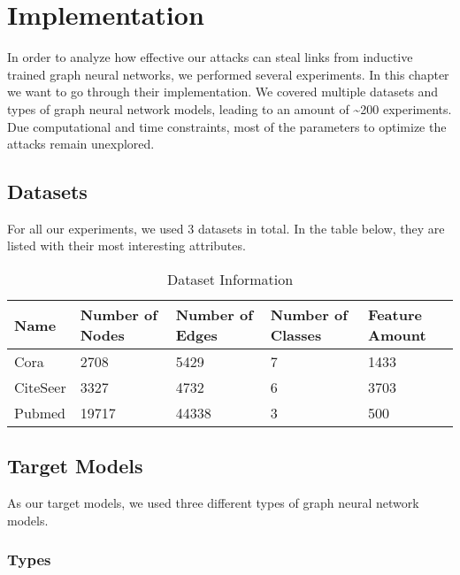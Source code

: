 \chapter{Implementation}

  In order to analyze how effective our attacks can steal links from inductive trained graph neural networks, we performed several experiments.
  In this chapter we want to go through their implementation.
  We covered multiple datasets and types of graph neural network models, leading to an amount of \textasciitilde200 experiments.
  Due computational and time constraints, most of the parameters to optimize the attacks remain unexplored.

  \section{Datasets}

    For all our experiments, we used 3 datasets in total.
    In the table below, they are listed with their most interesting attributes.

    \vspace{0.48cm}
    \begin{table}[!h]
      \centering
      \footnotesize
      \begin{tabular}{l|l|l|l|l}
        \toprule
        Name & Number of Nodes & Number of Edges & Number of Classes & Feature Amount \\
        \midrule
        Cora & 2708            & 5429            & 7                 & 1433 \\
        CiteSeer & 3327        & 4732            & 6                 & 3703 \\
        Pubmed & 19717         & 44338           & 3                 & 500 \\
        \bottomrule
      \end{tabular}
      \caption{Dataset Information}
      \label{table:datasets}
    \end{table}

  \section{Target Models}

    As our target models, we used three different types of graph neural network models.

    \subsection{Types}
